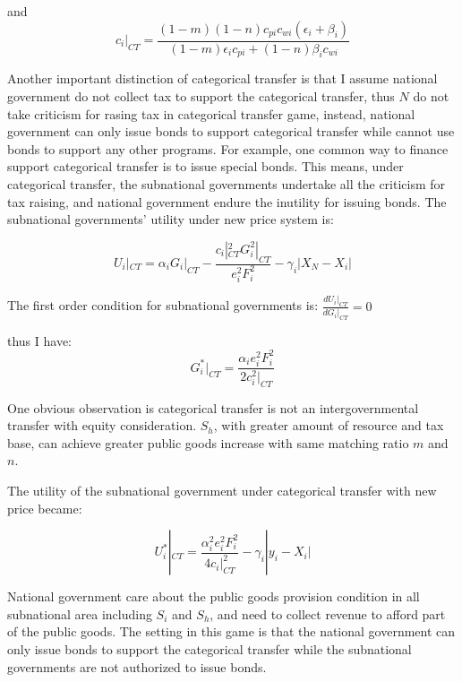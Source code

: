 \begin{itemize}
and
\begin{equation}
    c_i|_{CT}=\frac{(1-m)(1-n)c_{pi}c_{wi}(\epsilon_i+\beta_i)}{(1-m) \epsilon_i c_{pi}+(1-n)\beta_i c_{wi}}
\end{equation}

Another important distinction of categorical transfer is that I assume national government do not collect tax to support the categorical transfer, thus $N$ do not take criticism for rasing tax in categorical transfer game, instead, national government can only issue bonds to support categorical transfer while cannot use bonds to support any other programs. For example, one common way to finance support categorical transfer is to issue special bonds. This means, under categorical transfer, the subnational governments undertake all the criticism for tax raising, and national government endure the inutility for issuing bonds. The subnational governments' utility under new price system is:

$$U_i|_{CT}=\alpha_iG_i|_{CT}-\frac{c_i|_{CT}^2G_i^2|_{CT}}{e_i^2F_i^2}-\gamma_i|X_N-X_i|$$

The first order condition for subnational governments is:
$\frac{dU_i|_{CT}}{dG_i|_{CT}}=0$

thus I have:
\begin{equation}
    G_i^*|_{CT}=\frac{\alpha_i e_i^2 F_i^2}{2 c_i^2|_{CT}}
\end{equation}

One obvious observation is categorical transfer is not an intergovernmental transfer with equity consideration. $S_h$, with greater amount of resource and tax base, can achieve greater public goods increase with same matching ratio $m$ and $n$.

The utility of the subnational government under categorical transfer with new price became:

\begin{equation}
    U_i^*|_{CT}=\frac{\alpha_i^2 e_i^2 F_i^2}{4c_i|_{CT}^2}-\gamma_i|y_i-X_i|
\end{equation}

National government care about the public goods provision condition in all subnational area including $S_i$ and $S_h$, and need to collect revenue to afford part of the public goods. The setting in this game is that the national government can only issue bonds to support the categorical transfer while the subnational governments are not authorized to issue bonds.


\end{itemize}
